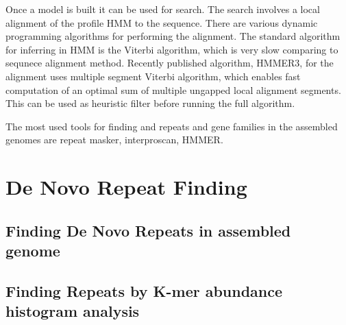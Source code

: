Once a model is built it can be used for search. The search involves a local alignment of the profile HMM to the sequence.
There are various dynamic programming algorithms for performing the alignment. The standard algorithm for inferring in HMM is the Viterbi algorithm, which is very slow comparing to sequnece alignment method\cite{eddy2011accelerated}. Recently published algorithm, HMMER3\cite{eddy2011accelerated}, for the alignment uses multiple segment Viterbi algorithm\cite{eddy2011accelerated}, which enables fast computation of an optimal sum of multiple ungapped local
alignment segments. This can be used as heuristic filter before running the full algorithm.

The most used tools for finding and repeats and gene families in the assembled genomes are repeat masker\cite{repeatmasker}, interproscan\cite{mitchell2015interpro}, HMMER\cite{eddy2011accelerated}.


\section{De Novo Repeat Finding}

\subsection{Finding De Novo Repeats in assembled genome}

\subsection{Finding Repeats by K-mer abundance histogram analysis}

